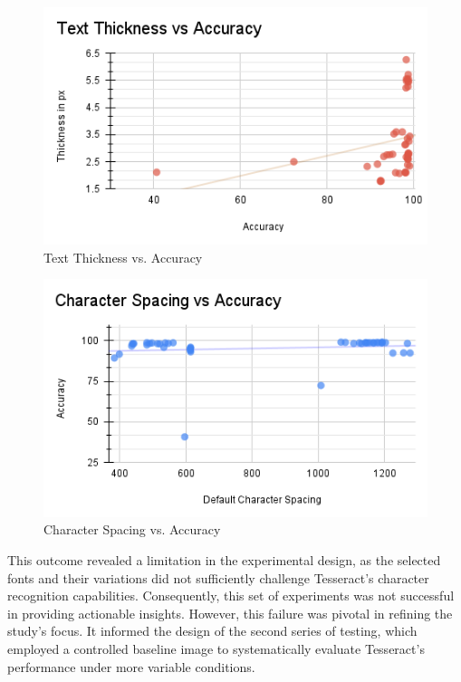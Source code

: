 \documentclass[10pt,twocolumn]{article}
\begin{document}
\begin{figure}[h!]
    \centering
    \includegraphics[width=\linewidth]{Figures/Figure_A.png}
    \caption{Text Thickness vs. Accuracy}
    \label{fig:FigA}
\end{figure}
\begin{figure}[h!]
    \centering
    \includegraphics[width=\linewidth]{Figures/Figure_B.png}
    \caption{Character Spacing vs. Accuracy}
    \label{fig:FigB}
\end{figure}



This outcome revealed a limitation in the experimental design, as the selected fonts and their variations did not sufficiently challenge Tesseract’s character recognition capabilities. Consequently, this set of experiments was not successful in providing actionable insights. However, this failure was pivotal in refining the study's focus. It informed the design of the second series of testing, which employed a controlled baseline image to systematically evaluate Tesseract's performance under more variable conditions.
\end{document}
